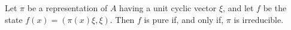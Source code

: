 Let $\pi$ be a representation of $A$ having a unit cyclic vector $\xi$, and let $f$ be the state $f(x) = (\pi(x)\xi, \xi)$. Then $f$ is pure if, and only if, $\pi$ is irreducible.
